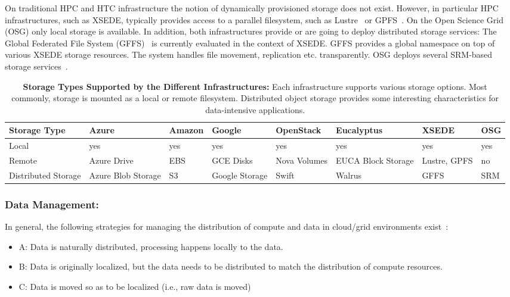 \documentclass[times]{cpeauth}
\begin{document}
On traditional HPC and HTC infrastructure the notion of dynamically
provisioned storage does not exist. However, in particular HPC
infrastructures, such as XSEDE, typically provides access to a parallel
filesystem, such as Lustre~\cite{lustre} or
GPFS~\cite{Schmuck:2002:GSF:1083323.1083349}. On the Open Science Grid (OSG)
only local storage is available. In addition, both infrastructures provide or
are going to deploy distributed storage services: The Global Federated File
System (GFFS)~\cite{gffs} is currently evaluated in the context of XSEDE. GFFS
provides a global namespace on top of various XSEDE storage resources. The
system handles file movement, replication etc. transparently. OSG deploys 
several SRM-based storage services~\cite{srm-ogf}.



\begin{table}[t]
\centering
\begin{tabular}{|p{1.7cm}|p{1.3cm}|p{1.3cm}|p{1.3cm}|p{1.4cm}|p{1.4cm}|p{1.3cm}|p{1.2cm}|}
	\hline
	\textbf{Storage Type} &\textbf{Azure} &\textbf{Amazon} &\textbf{Google} &\textbf{Open\-Stack} &\textbf{Euca\-lyptus} &\textbf{XSEDE}  &\textbf{OSG} \\
	\hline
	Local	&yes &yes &yes &yes &yes &yes &yes\\
	\hline
	Remote &Azure Drive &EBS &GCE Disks &Nova Volumes &EUCA Block Storage &Lustre, GPFS 
	&no\\
	\hline
	Distributed Storage &Azure Blob Storage &S3 &Google Storage &Swift & Walrus &GFFS
	 &SRM\\
	\hline	
\end{tabular}
\caption{\textbf{Storage Types Supported by the Different Infrastructures:} 
Each infrastructure supports various storage options. Most commonly, storage 
is mounted as a local or remote filesystem. Distributed object storage 
provides some interesting characteristics for data-intensive applications. 
\label{tab:storage-systems}}
\end{table}

\subsubsection*{Data Management:}

In general, the following strategies for managing the distribution of compute 
and data in cloud/grid environments exist~\cite{jha-katz-2013}:
\begin{itemize}
\item A: Data is naturally distributed, processing happens locally to
	the data.
\item B: Data is originally localized, but the data needs to be distributed to 		
	match the distribution of compute resources.
\item C: Data is moved so as to be localized (i.e., raw data is moved)
\end{itemize}
\end{document}
